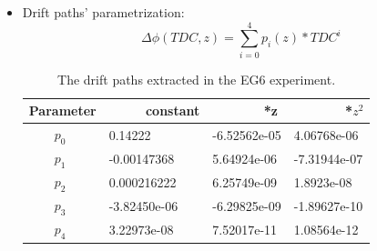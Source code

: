 \begin{itemize}
~\newpage
\item Drift paths' parametrization:
\begin{equation}
  \Delta \phi (TDC, z)=  \sum\limits_{i=0}^{4} p_{i}(z)*TDC^{i}
\end{equation}
\begin{table}[!h]
\begin{center}
\begin{tabular}{|l|l|l|l|}
\hline
Parameter & ~~~~~constant & ~~~~~~~*z & ~~~~~~~*$z^{2}$\\
\hline
~~~~$p_{0}$   & 0.14222     &-6.52562e-05 & 4.06768e-06\\
\hline
~~~~$p_{1}$   &-0.00147368  & 5.64924e-06 &-7.31944e-07\\
\hline
~~~~$p_{2}$   & 0.000216222 & 6.25749e-09 & 1.8923e-08 \\
\hline
~~~~$p_{3}$   &-3.82450e-06 &-6.29825e-09 &-1.89627e-10\\
\hline
~~~~$p_{4}$   & 3.22973e-08 & 7.52017e-11 & 1.08564e-12\\
\hline
\end{tabular}
\caption{The drift paths extracted in the EG6 experiment.}
\label{table:drift_paths}
\end{center}
\end{table}

\end{itemize}

